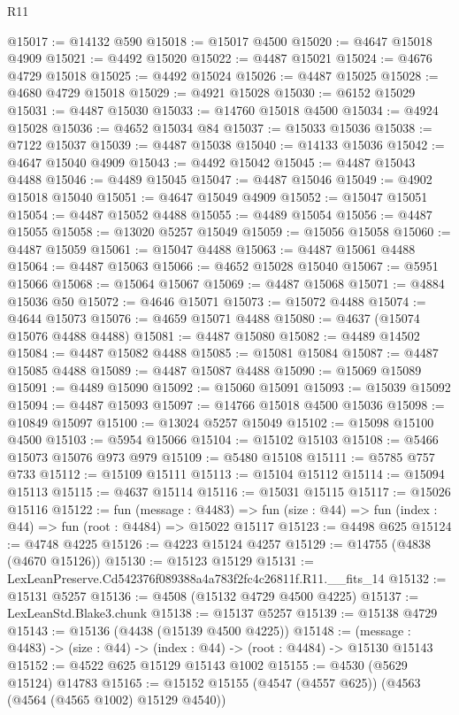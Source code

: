 \begin{lexlean}{R11}
\begin{coremodule}
@15017 := @14132 @590
@15018 := @15017 @4500
@15020 := @4647 @15018 @4909
@15021 := @4492 @15020
@15022 := @4487 @15021
@15024 := @4676 @4729 @15018
@15025 := @4492 @15024
@15026 := @4487 @15025
@15028 := @4680 @4729 @15018
@15029 := @4921 @15028
@15030 := @6152 @15029
@15031 := @4487 @15030
@15033 := @14760 @15018 @4500
@15034 := @4924 @15028
@15036 := @4652 @15034 @84
@15037 := @15033 @15036
@15038 := @7122 @15037
@15039 := @4487 @15038
@15040 := @14133 @15036
@15042 := @4647 @15040 @4909
@15043 := @4492 @15042
@15045 := @4487 @15043 @4488
@15046 := @4489 @15045
@15047 := @4487 @15046
@15049 := @4902 @15018 @15040
@15051 := @4647 @15049 @4909
@15052 := @15047 @15051
@15054 := @4487 @15052 @4488
@15055 := @4489 @15054
@15056 := @4487 @15055
@15058 := @13020 @5257 @15049
@15059 := @15056 @15058
@15060 := @4487 @15059
@15061 := @15047 @4488
@15063 := @4487 @15061 @4488
@15064 := @4487 @15063
@15066 := @4652 @15028 @15040
@15067 := @5951 @15066
@15068 := @15064 @15067
@15069 := @4487 @15068
@15071 := @4884 @15036 @50
@15072 := @4646 @15071
@15073 := @15072 @4488
@15074 := @4644 @15073
@15076 := @4659 @15071 @4488
@15080 := @4637 (@15074 @15076 @4488 @4488)
@15081 := @4487 @15080
@15082 := @4489 @14502
@15084 := @4487 @15082 @4488
@15085 := @15081 @15084
@15087 := @4487 @15085 @4488
@15089 := @4487 @15087 @4488
@15090 := @15069 @15089
@15091 := @4489 @15090
@15092 := @15060 @15091
@15093 := @15039 @15092
@15094 := @4487 @15093
@15097 := @14766 @15018 @4500 @15036
@15098 := @10849 @15097
@15100 := @13024 @5257 @15049
@15102 := @15098 @15100 @4500
@15103 := @5954 @15066
@15104 := @15102 @15103
@15108 := @5466 @15073 @15076 @973 @979
@15109 := @5480 @15108
@15111 := @5785 @757 @733
@15112 := @15109 @15111
@15113 := @15104 @15112
@15114 := @15094 @15113
@15115 := @4637 @15114
@15116 := @15031 @15115
@15117 := @15026 @15116
@15122 := fun (message : @4483) =>
  fun (size : @44) => fun (index : @44) => fun (root : @4484) => @15022 @15117
@15123 := @4498 @625
@15124 := @4748 @4225
@15126 := @4223 @15124 @4257
@15129 := @14755 (@4838 (@4670 @15126))
@15130 := @15123 @15129
@15131 := LexLeanPreserve.Cd542376f089388a4a783f2fc4c26811f.R11.__fits_14
@15132 := @15131 @5257
@15136 := @4508 (@15132 @4729 @4500 @4225)
@15137 := LexLeanStd.Blake3.chunk
@15138 := @15137 @5257
@15139 := @15138 @4729
@15143 := @15136 (@4438 (@15139 @4500 @4225))
@15148 := (message : @4483) -> (size : @44) -> (index : @44) -> (root : @4484) -> @15130 @15143
@15152 := @4522 @625 @15129 @15143 @1002
@15155 := @4530 (@5629 @15124) @14783
@15165 := @15152 @15155 (@4547 (@4557 @625)) (@4563 (@4564 (@4565 @1002) @15129 @4540))

\end{coremodule}
\end{lexlean}
